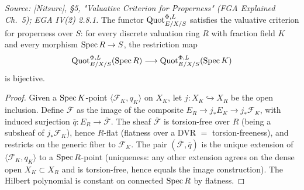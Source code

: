 \begin{lemma}
  \label{lem:quot_valuative_criterion}
  \textit{Source: [Nitsure], \S 5, "Valuative Criterion for Properness"
  (FGA Explained Ch.~5); EGA IV(2) 2.8.1.}
  The functor \(\operatorname{Quot}^{\Phi,L}_{E/X/S}\) satisfies the valuative criterion
  for properness over \(S\): for every discrete valuation ring \(R\) with
  fraction field \(K\) and every morphism \(\operatorname{Spec} R \to S\), the restriction
  map
  \[
    \operatorname{Quot}^{\Phi,L}_{E/X/S}(\operatorname{Spec} R)
    \longrightarrow
    \operatorname{Quot}^{\Phi,L}_{E/X/S}(\operatorname{Spec} K)
  \]
  is bijective.
\end{lemma}

\begin{proof}
  
  Given a \(\operatorname{Spec} K\)-point \(\langle \mathcal{F}_K, q_K\rangle\) on \(X_K\),
  let \(j : X_K \hookrightarrow X_R\) be the open inclusion. Define
  \(\overline{\mathcal{F}}\) as the image of the composite
  \(E_R \to j_* E_K \to j_* \mathcal{F}_K\), with induced surjection
  \(\overline{q} : E_R \to \overline{\mathcal{F}}\). The sheaf
  \(\overline{\mathcal{F}}\) is torsion-free over \(R\) (being a subsheaf of
  \(j_* \mathcal{F}_K\)), hence \(R\)-flat (flatness over a DVR
  \(=\) torsion-freeness), and restricts on the generic fiber to
  \(\mathcal{F}_K\). The pair \((\overline{\mathcal{F}}, \overline{q})\) is
  the unique extension of \(\langle \mathcal{F}_K, q_K\rangle\) to a
  \(\operatorname{Spec} R\)-point (uniqueness: any other extension agrees on the dense
  open \(X_K \subset X_R\) and is torsion-free, hence equals the image
  construction). The Hilbert polynomial is constant on connected
  \(\operatorname{Spec} R\) by flatness.
\end{proof}

